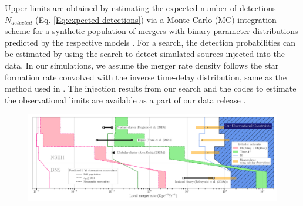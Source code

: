Upper limits are obtained by estimating the expected number of detections $N_{detected}$ (Eq. \ref{Eq:expected-detections}) via a Monte Carlo (MC) integration scheme for a synthetic population of mergers with binary parameter distributions predicted by the respective models \cite{Tiwari:2017ndi}. For a search, the detection probabilities can be estimated by using the search to detect simulated sources injected into the data. In our simulations, we assume the merger rate density follows the star formation rate \cite{Madau:2016jbv} convolved with the inverse time-delay distribution, same as the method used in \cite{Zhu:2020ffa, Wu:2022pyg}. The injection results from our search and the codes to estimate the observational limits are available as a part of our data release \cite{github}.  


\begin{figure}
    \centering
    \includegraphics[width=\textwidth]{figures/ecc_search/expected_ranges.png}

\end{figure}
